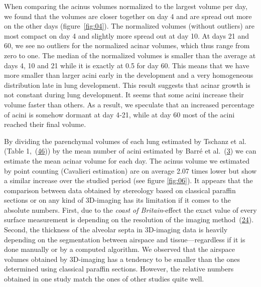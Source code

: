 \documentclass[
  american,
]{article}
\begin{document}
When comparing the acinus volumes normalized to the largest volume per day, we found that the volumes are closer together on day 4 and are spread out more on the other days (figure~\ref{fig:04}).
The normalized volumes (without outliers) are most compact on day 4 and slightly more spread out at day 10.
At days 21 and 60, we see no outliers for the normalized acinar volumes, which thus range from zero to one.
The median of the normalized volumes is smaller than the average at days 4, 10 and 21 while it is exactly at 0.5 for day 60.
This means that we have more smaller than larger acini early in the development and a very homogeneous distribution late in lung development.
This result suggests that acinar growth is not constant during lung development.
It seems that some acini increase their volume faster than others.
As a result, we speculate that an increased percentage of acini is somehow dormant at day 4‐21, while at day 60 most of the acini reached their final volume.

By dividing the parenchymal volumes of each lung estimated by Tschanz et al.
(Table 1,~(\protect\hyperlink{ref-wnl86DEM}{46})) by the mean number of acini estimated by Barré et al.~(\protect\hyperlink{ref-uFNlWogb}{3}) we can estimate the mean acinar volume for each day.
The acinus volume we estimated by point counting (Cavalieri estimation) are on average 2.07 times lower but show a similar increase over the studied period (see figure \ref{fig:06}).
It appears that the comparison between data obtained by stereology based on classical paraffin sections or on any kind of 3D-imaging has its limitation if it comes to the absolute numbers.
First, due to the \emph{coast of Britain}-effect the exact value of every surface measurement is depending on the resolution of the imaging method~(\protect\hyperlink{ref-AdXhaEV4}{24}).
Second, the thickness of the alveolar septa in 3D-imaging data is heavily depending on the segmentation between airspace and tissue---regardless if it is done manually or by a computed algorithm.
We observed that the airspace volumes obtained by 3D-imaging has a tendency to be smaller than the ones determined using classical paraffin sections.
However, the relative numbers obtained in one study match the ones of other studies quite well.
\end{document}
